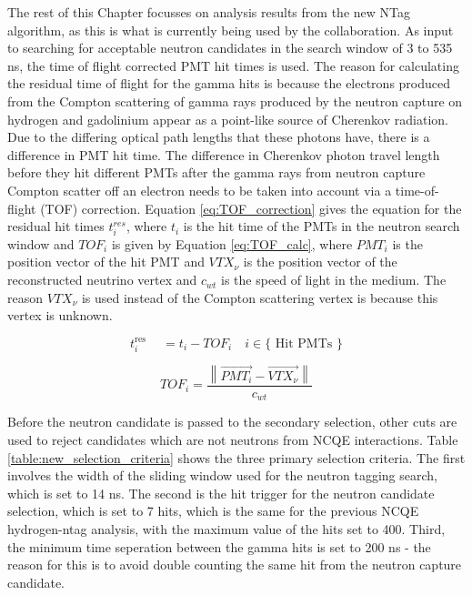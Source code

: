 The rest of this Chapter focusses on analysis results from the new NTag algorithm, as this is what is currently being used by the collaboration. As input to searching for acceptable neutron candidates in the search window of 3 to 535 ns, the time of flight corrected PMT hit times is used. The reason for calculating the residual time of flight for the gamma hits is because the electrons produced from the Compton scattering of gamma rays produced by the neutron capture on hydrogen and gadolinium appear as a point-like source of Cherenkov radiation. Due to the differing optical path lengths that these photons have, there is a difference in PMT hit time. The difference in Cherenkov photon travel length before they hit different PMTs after the gamma rays from neutron capture Compton scatter off an electron needs to be taken into account via a time-of-flight (TOF) correction. Equation \ref{eq:TOF_correction} gives the equation for the residual hit times $t_{i}^{res}$, where $t_{i}$ is the hit time of the PMTs in the neutron search window and $TOF_{i}$ is given by Equation \ref{eq:TOF_calc}, where $PMT_{i}$ is the position vector of the hit PMT and $VTX_{\nu}$ is the position vector of the reconstructed neutrino vertex and $c_{wt}$ is the speed of light in the medium. The reason $VTX_{\nu}$ is used instead of the Compton scattering vertex is because this vertex is unknown. 

\begin{equation}
    t_i^{\text {res }} \quad=t_i-T O F_i \quad i \in\{\text { Hit PMTs }\}
    \label{eq:TOF_correction}
\end{equation}

\begin{equation}
T O F_i=\frac{\left\|\overrightarrow{P M T_i}-\overrightarrow{V T X_\nu}\right\|}{c_{w t}}
\label{eq:TOF_calc}
\end{equation}

Before the neutron candidate is passed to the secondary selection, other cuts are used to reject candidates which are not neutrons from NCQE interactions. Table \ref{table:new_selection_criteria} shows the three primary selection criteria. The first involves the width of the sliding window used for the neutron tagging search, which is set to 14 ns. The second is the hit trigger for the neutron candidate selection, which is set to 7 hits, which is the same for the previous NCQE hydrogen-ntag analysis, with the maximum value of the hits set to 400. Third, the minimum time seperation between the gamma hits is set to 200 ns - the reason for this is to avoid double counting the same hit from the neutron capture candidate. 


